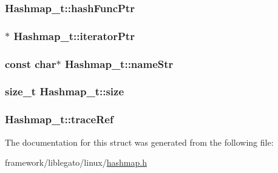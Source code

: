 \subsubsection[{\texorpdfstring{hash\+Func\+Ptr}{hashFuncPtr}}]{ Hashmap\+\_\+t\+::hash\+Func\+Ptr}\hypertarget{struct_hashmap__t_a5587251cbb31b6115f9c6889dcc3747c}{}\label{struct_hashmap__t_a5587251cbb31b6115f9c6889dcc3747c}
\subsubsection[{\texorpdfstring{iterator\+Ptr}{iteratorPtr}}]{$\ast$ Hashmap\+\_\+t\+::iterator\+Ptr}\hypertarget{struct_hashmap__t_aac110660e8d339fb694a0445428c515f}{}\label{struct_hashmap__t_aac110660e8d339fb694a0445428c515f}
\subsubsection[{\texorpdfstring{name\+Str}{nameStr}}]{\setlength{\rightskip}{0pt plus 5cm}const char$\ast$ Hashmap\+\_\+t\+::name\+Str}\hypertarget{struct_hashmap__t_a4cb4fe5b623e15ed5d4b18ef51c1c989}{}\label{struct_hashmap__t_a4cb4fe5b623e15ed5d4b18ef51c1c989}
\subsubsection[{\texorpdfstring{size}{size}}]{\setlength{\rightskip}{0pt plus 5cm}size\+\_\+t Hashmap\+\_\+t\+::size}\hypertarget{struct_hashmap__t_a4033cab9310a81f5422f78cb4222c172}{}\label{struct_hashmap__t_a4033cab9310a81f5422f78cb4222c172}
\subsubsection[{\texorpdfstring{trace\+Ref}{traceRef}}]{ Hashmap\+\_\+t\+::trace\+Ref}\hypertarget{struct_hashmap__t_aae3a70b3fdc983893549c030a29b19de}{}\label{struct_hashmap__t_aae3a70b3fdc983893549c030a29b19de}


The documentation for this struct was generated from the following file\+:\begin{DoxyCompactItemize}
\item 
framework/liblegato/linux/\hyperlink{hashmap_8h}{hashmap.\+h}\end{DoxyCompactItemize}
